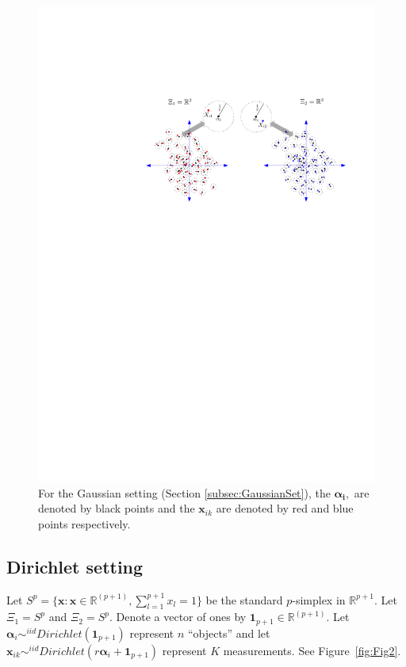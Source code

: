\documentclass[11pt]{article} %
\begin{document}
    \begin{figure}
	\begin{center}
    \includegraphics[scale=0.75]{MVN_alpha_r_multiple_sancar.pdf}
    \caption{For the  Gaussian setting (Section \ref{subsec:GaussianSet}), the $\bm{\alpha_i},$ are denoted by black points and the $\bm{x}_{ik}$ are denoted by red and blue points respectively.}
\label{fig:Fig1}
	\end{center}
  \end{figure}

\subsection{Dirichlet setting\label{subsec:DirichletSet}}
Let $S^p=\{\bm{x}:\bm{x}\in\mathbb{R}^{(p+1)}, \sum_{l=1}^{p+1}{x_l}=1\}$ be the standard $p$-simplex in $\mathbb{R}^{p+1}$.
 Let $\Xi_1 = S^p$ and $\Xi_2 = S^p$.   Denote a vector of ones by $\bm{1}_{p+1}\in \mathbb{R}^{(p+1)}$.
  Let $\bm{\alpha}_i \sim^{iid} Dirichlet(\bm{1}_{p+1})$ represent $n$  ``objects'' and let $\bm{x}_{ik} \sim^{iid} Dirichlet(r\bm{\alpha}_i+\bm{1}_{p+1})$ represent $K$ measurements. 
See Figure~\ref{fig:Fig2}.
\end{document}
